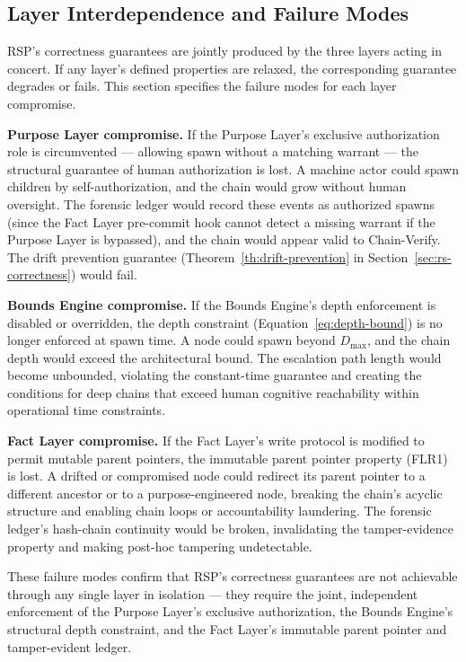 \subsection{Layer Interdependence and Failure Modes}
\label{sec:rs-layer-failure}

RSP's correctness guarantees are jointly produced by the three layers acting in concert. If any layer's defined properties are relaxed, the corresponding guarantee degrades or fails. This section specifies the failure modes for each layer compromise.

\medskip
\noindent\textbf{Purpose Layer compromise.} If the Purpose Layer's exclusive authorization role is circumvented --- allowing spawn without a matching warrant --- the structural guarantee of human authorization is lost. A machine actor could spawn children by self-authorization, and the chain would grow without human oversight. The forensic ledger would record these events as authorized spawns (since the Fact Layer pre-commit hook cannot detect a missing warrant if the Purpose Layer is bypassed), and the chain would appear valid to Chain-Verify. The drift prevention guarantee (Theorem~\ref{th:drift-prevention} in Section~\ref{sec:rs-correctness}) would fail.

\medskip
\noindent\textbf{Bounds Engine compromise.} If the Bounds Engine's depth enforcement is disabled or overridden, the depth constraint (Equation~\ref{eq:depth-bound}) is no longer enforced at spawn time. A node could spawn beyond $D_{\max}$, and the chain depth would exceed the architectural bound. The escalation path length would become unbounded, violating the constant-time guarantee and creating the conditions for deep chains that exceed human cognitive reachability within operational time constraints.

\medskip
\noindent\textbf{Fact Layer compromise.} If the Fact Layer's write protocol is modified to permit mutable parent pointers, the immutable parent pointer property (FLR1) is lost. A drifted or compromised node could redirect its parent pointer to a different ancestor or to a purpose-engineered node, breaking the chain's acyclic structure and enabling chain loops or accountability laundering. The forensic ledger's hash-chain continuity would be broken, invalidating the tamper-evidence property and making post-hoc tampering undetectable.

These failure modes confirm that RSP's correctness guarantees are not achievable through any single layer in isolation --- they require the joint, independent enforcement of the Purpose Layer's exclusive authorization, the Bounds Engine's structural depth constraint, and the Fact Layer's immutable parent pointer and tamper-evident ledger.